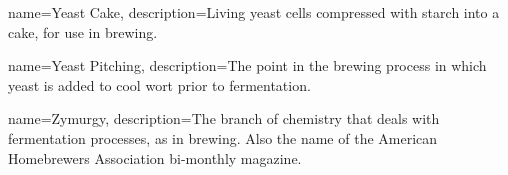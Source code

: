 {
  name={Yeast Cake},
  description={Living yeast cells compressed with starch into a cake, for use in brewing.}
  }

{
  name={Yeast Pitching},
  description={The point in the brewing process in which yeast is added to cool wort prior to fermentation.}
  }

{
  name={Zymurgy},
  description={The branch of chemistry that deals with fermentation processes, as in brewing. Also the name of the American Homebrewers Association bi-monthly magazine.}
  }

\makeglossaries
